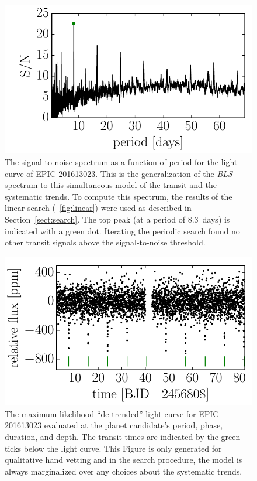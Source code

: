 \documentclass[12pt,preprint]{aastex}
\newcommand{\project}[1]{\textsl{#1}} %
\newcommand{\figref}[1]{\ref{fig:#1}}
\newcommand{\Fig}[1]{\figurename~\figref{#1}}
\newcommand{\fig}[1]{\Fig{#1}}
\newcommand{\figlabel}[1]{\label{fig:#1}}
\newcommand{\sectionname}{Section}
\newcommand{\Sect}[1]{\sectionname~\ref{sect:#1}}
\newcommand{\sect}[1]{\Sect{#1}}
\begin{document}
\begin{figure}[p]
\begin{center}
\includegraphics{figures/periodic.pdf}
\end{center}
\caption{%
The signal-to-noise spectrum as a function of period for the light curve of
EPIC 201613023.
This is the generalization of the \project{BLS} spectrum \citep{bls} to this
simultaneous model of the transit and the systematic trends.
To compute this spectrum, the results of the linear search (\fig{linear})
were used as described in \sect{search}.
The top peak (at a period of 8.3~days) is indicated with a green dot.
Iterating the periodic search found no other transit signals above the
signal-to-noise threshold.
\figlabel{periodic}}
\end{figure}

\begin{figure}[p]
\begin{center}
\includegraphics{figures/de-trended.pdf}
\end{center}
\caption{%
The maximum likelihood ``de-trended'' light curve for EPIC 201613023
evaluated at the planet candidate's period, phase, duration, and depth.
The transit times are indicated by the green ticks below the light curve.
This Figure is only generated for qualitative hand vetting and in the search
procedure, the model is always marginalized over any choices about the
systematic trends.
\figlabel{de-trended}}
\end{figure}
\end{document}
